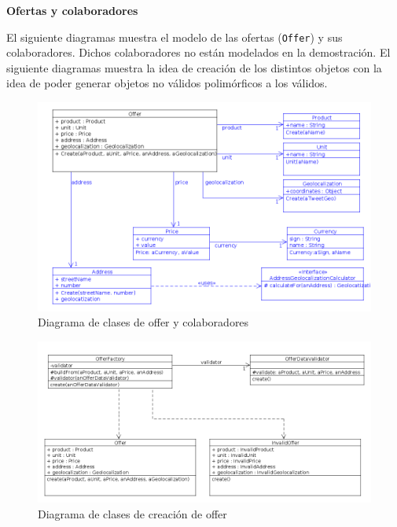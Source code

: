 \textbf{Ofertas y colaboradores}

El siguiente diagramas muestra el modelo de las ofertas (\texttt{Offer}) y sus colaboradores. Dichos colaboradores no están modelados en la demostración.
El siguiente diagramas muestra la idea de creación de los distintos objetos
con la idea de poder generar objetos no válidos polimórficos a los válidos.

\begin{figure}[h]
\centerline{\includegraphics[width=\textwidth]{./imgs/class_diagram_offer.png}}
\caption{Diagrama de clases de offer y colaboradores}
\label{fig:class_offer}
\end{figure}

\begin{figure}[h]
\centerline{\includegraphics[width=\textwidth]{./imgs/class_diagram_Offer_Factory.png}}
\caption{Diagrama de clases de creación de offer}
\label{fig:class_Offer_Factory}
\end{figure}

